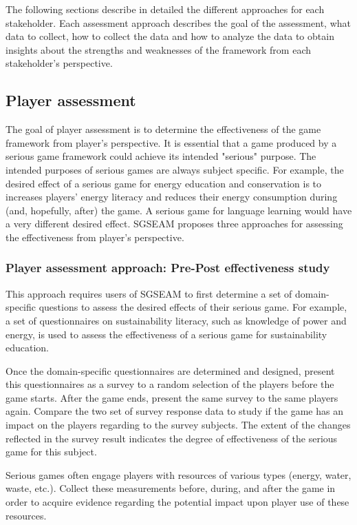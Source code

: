 \documentclass[11pt,oneside]{book}
\begin{document}
The following sections describe in detailed the different approaches for each stakeholder.  Each assessment 
approach describes the goal of the assessment, what data to collect, how to collect the data and how to 
analyze the data to obtain insights about the strengths and weaknesses of the framework from each 
stakeholder's perspective.

\subsection{Player assessment}

The goal of player assessment is to determine the effectiveness of the game
framework from player's perspective. It is essential that a game produced by a serious game
framework could achieve its intended "serious" purpose. The intended purposes of serious games are
always subject specific. For example, the desired effect of a serious game for
energy education and conservation is to increases players' energy literacy and
reduces their energy consumption during (and, hopefully, after) the game. A serious game for
language learning would have a very different desired effect. SGSEAM proposes three approaches for 
assessing the effectiveness from player's perspective.

\subsubsection{Player assessment approach: Pre-Post effectiveness study}
\label{Pre-Post effectiveness study}

This approach requires users of SGSEAM to first determine a set of domain-specific questions to assess the 
desired effects of their serious game. For example, a set of questionnaires on sustainability literacy, such as 
knowledge of power and energy, is used to assess the effectiveness of a serious game for sustainability education.

Once the domain-specific questionnaires are determined and designed, present this questionnaires as a 
survey to a random selection of the players before the game starts. After the game ends, present the same 
survey to the same players again. Compare the two set of survey response data to study if the game has an 
impact on the players regarding to the survey subjects. The extent of the changes reflected in the survey 
result indicates the degree of effectiveness of the serious game for this subject.

Serious games often engage players with resources of various types (energy, water, waste, etc.). Collect 
these measurements before, during, and after the game in order to acquire evidence regarding the potential 
impact upon player use of these resources.
\end{document}

